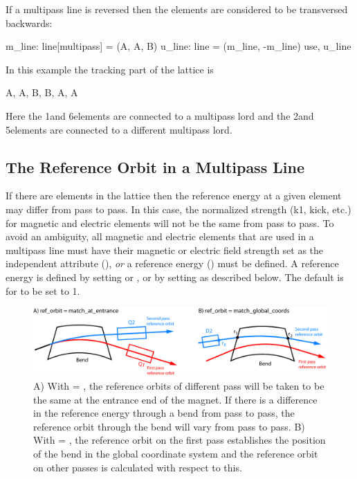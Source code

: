 If a multipass line is reversed then the elements are considered to be
transversed backwards:
\begin{example}
  m_line: line[multipass] = (A, A, B)
  u_line: line = (m_line, -m_line)
  use, u_line
\end{example}
In this example the tracking part of the lattice is
\begin{example}
  A, A, B, B, A, A
\end{example}
Here the 1\St and 6\Th elements are connected to a multipass lord and the
2\Nd and 5\Th elements are connected to a different multipass lord.

\subsection{The Reference Orbit in a Multipass Line}

If there are  elements in the lattice then the reference
energy at a given element may differ from pass to pass. In this case,
the normalized strength (k1, kick, etc.) for magnetic and electric
elements will not be the same from pass to pass. To avoid an
ambiguity, all magnetic and electric elements that are used in a
multipass line must have their magnetic or electric field strength set
as the independent attribute (), {\em or} a reference
energy () must be defined. A reference energy is
defined by setting  or , or by setting
 as described below. The default is for 
to be set to 1.

\begin{figure}[tb]
\centering 
\includegraphics[width=6.2in]{multipass_bend.pdf} 
\caption[The reference orbit with a multipass bend.]  
{A) With  = , the reference orbits
of different pass will be taken to be the same at the entrance end of
the magnet. If there is a difference in the reference energy through a
bend from pass to pass, the reference orbit through the bend will vary
from pass to pass. B) With  = ,
the reference orbit on the first pass establishes the position of the
bend in the global coordinate system and the reference orbit on other
passes is calculated with respect to this.}
\label{f:multipass.bend}
\end{figure}

